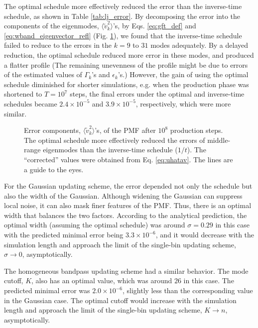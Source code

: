 \documentclass[reprint, superscriptaddress, floatfix]{revtex4-1}
\begin{document}
The optimal schedule more effectively reduced
the error than the inverse-time schedule,
as shown in Table \ref{tab:lj_error}.
%
By decomposing the error
into the components of the eigenmodes,
$\langle \tilde v_k^2 \rangle$'s,
by Eqs. \eqref{eq:gft_def} and \eqref{eq:wband_eigenvector_refl}
(Fig. \ref{fig:lj_xerr}),
we found that the inverse-time schedule
failed to reduce to the errors in the $k = 9$ to $31$ modes adequately.
%
By a delayed reduction,
the optimal schedule reduced
more error in these modes,
and produced a flatter profile
(The remaining unevenness of the profile
might be due to errors of the estimated values of
$\Gamma_k$'s and $\epsilon_k$'s.)
%
However, the gain of using the optimal schedule
diminished for shorter simulations,
e.g. when the production phase was shortened to $T = 10^7$ steps,
the final errors under the optimal and inverse-time schedules
became $2.4\times 10^{-5}$ and $3.9\times 10^{-5}$, respectively,
which were more similar.

\begin{figure}[h]\centering
  \caption{
    \label{fig:lj_xerr}
    Error components,
    $\langle \tilde v_k^2 \rangle$'s,
    of the PMF after $10^8$ production steps.
    The optimal schedule more effectively
    reduced the errors of middle-range eigenmodes
    than the inverse-time schedule ($1/t$).
    The ``corrected'' values were obtained from
    Eq. \eqref{eq:uhatav}.
    The lines are a guide to the eyes.
  }
\end{figure}


For the Gaussian updating scheme,
the error depended not only the schedule
but also the width of the Gaussian.
%
Although widening the Gaussian
can suppress local noise,
it can also mask finer features of the PMF.\cite{laio2005}
%
Thus, there is an optimal width that balances the two factors.
%
According to the analytical prediction,
the optimal width (assuming the optimal schedule)
was around $\sigma = 0.29$ in this case
with the predicted minimal error being $3.3\times 10^{-6}$,
and it would decrease with the simulation length
and approach the limit of the single-bin updating scheme,
$\sigma \to 0$, asymptotically.

The homogeneous bandpass updating scheme
had a similar behavior.
%
The mode cutoff, $K$, also has an optimal value,
which was around $26$ in this case.
%
The predicted minimal error was $2.0\times 10^{-6}$,
  slightly less than the corresponding value
  in the Gaussian case.
%
The optimal cutoff would increase with the simulation length
and approach the limit of the single-bin updating scheme, $K \to n$,
asymptotically.
\end{document}
